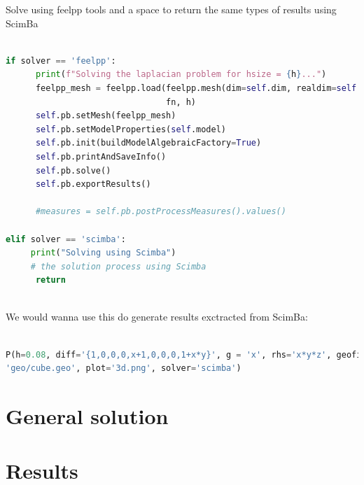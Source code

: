 \documentclass[12pt]{article}
\begin{document}
\begin{enumerate}
\newpage

Solve using feelpp tools and a space to return the same types of results using ScimBa

\begin{lstlisting}[language=Python,caption={},frame=single, backgroundcolor=\color{gray!10}, basicstyle=\footnotesize,rulecolor=\color{blue}, framexleftmargin=3pt, commentstyle=\color{mygreen}, keywordstyle=\color{blue}]

if solver == 'feelpp':
      print(f"Solving the laplacian problem for hsize = {h}...")
      feelpp_mesh = feelpp.load(feelpp.mesh(dim=self.dim, realdim=self.dim), 
                                fn, h)
      self.pb.setMesh(feelpp_mesh)
      self.pb.setModelProperties(self.model)
      self.pb.init(buildModelAlgebraicFactory=True)
      self.pb.printAndSaveInfo()
      self.pb.solve()
      self.pb.exportResults()
    
      #measures = self.pb.postProcessMeasures().values()

elif solver == 'scimba':
     print("Solving using Scimba")
     # the solution process using Scimba
      return
      
\end{lstlisting}

We would wanna use this do generate results exctracted from ScimBa:

\begin{lstlisting}[language=Python,caption={},frame=single, backgroundcolor=\color{gray!10}, basicstyle=\footnotesize,rulecolor=\color{blue}, framexleftmargin=3pt, commentstyle=\color{mygreen}, keywordstyle=\color{blue}]

P(h=0.08, diff='{1,0,0,0,x+1,0,0,0,1+x*y}', g = 'x', rhs='x*y*z', geofile = 
'geo/cube.geo', plot='3d.png', solver='scimba') 

\end{lstlisting}

\newpage
\section{General solution}




\newpage

\section{Results}

\end{enumerate}
\end{document}
